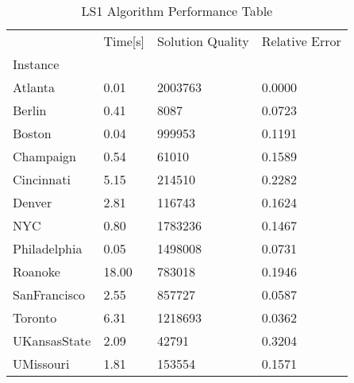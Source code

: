 \begin{table}
\caption{ LS1 Algorithm Performance Table }
\begin{tabular}{llll}
\toprule
{} & Time[s] & Solution Quality & Relative Error \\
Instance     &         &                  &                \\
\midrule
Atlanta      &    0.01 &          2003763 &         0.0000 \\
Berlin       &    0.41 &             8087 &         0.0723 \\
Boston       &    0.04 &           999953 &         0.1191 \\
Champaign    &    0.54 &            61010 &         0.1589 \\
Cincinnati   &    5.15 &           214510 &         0.2282 \\
Denver       &    2.81 &           116743 &         0.1624 \\
NYC          &    0.80 &          1783236 &         0.1467 \\
Philadelphia &    0.05 &          1498008 &         0.0731 \\
Roanoke      &   18.00 &           783018 &         0.1946 \\
SanFrancisco &    2.55 &           857727 &         0.0587 \\
Toronto      &    6.31 &          1218693 &         0.0362 \\
UKansasState &    2.09 &            42791 &         0.3204 \\
UMissouri    &    1.81 &           153554 &         0.1571 \\
\bottomrule
\end{tabular}
\end{table}
